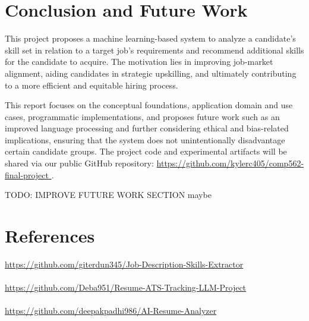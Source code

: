 \documentclass[11pt]{article}
\begin{document}
\section{Conclusion and Future Work}
This project proposes a machine learning-based system to analyze a candidate’s skill set in relation to a target job’s requirements and recommend additional skills for the candidate to acquire. The motivation lies in improving job-market alignment, aiding candidates in strategic upskilling, and ultimately contributing to a more efficient and equitable hiring process.

This report focuses on the conceptual foundations, application domain and use cases, programmatic implementations, and proposes future work such as an improved language processing and further considering ethical and bias-related implications, ensuring that the system does not unintentionally disadvantage certain candidate groups. The project code and experimental artifacts will be shared via our public GitHub repository: \url{https://github.com/kylerc405/comp562-final-project }.

TODO: IMPROVE FUTURE WORK SECTION maybe
\newpage
\section*{References}
\url{https://github.com/giterdun345/Job-Description-Skills-Extractor}
\\
\\
\url{https://github.com/Deba951/Resume-ATS-Tracking-LLM-Project}
\\
\\
\url{https://github.com/deepakpadhi986/AI-Resume-Analyzer}
\end{document}
